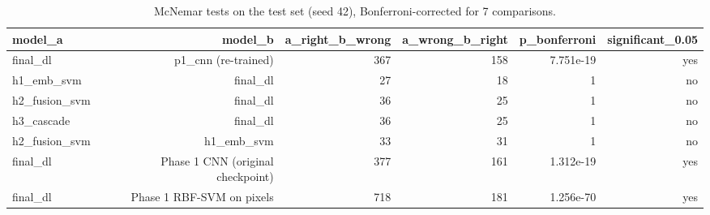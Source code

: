 \begin{table}[t]
\centering
\caption{McNemar tests on the test set (seed 42), Bonferroni-corrected for 7 comparisons.}
\label{tab:p2_mcnemar}
\footnotesize
\begin{tabular}{lrrrrr}
\toprule
model\_a & model\_b & a\_right\_b\_wrong & a\_wrong\_b\_right & p\_bonferroni & significant\_0.05 \\
\midrule
final\_dl & p1\_cnn (re-trained) & 367 & 158 & 7.751e-19 & yes \\
h1\_emb\_svm & final\_dl & 27 & 18 & 1 & no \\
h2\_fusion\_svm & final\_dl & 36 & 25 & 1 & no \\
h3\_cascade & final\_dl & 36 & 25 & 1 & no \\
h2\_fusion\_svm & h1\_emb\_svm & 33 & 31 & 1 & no \\
final\_dl & Phase 1 CNN (original checkpoint) & 377 & 161 & 1.312e-19 & yes \\
final\_dl & Phase 1 RBF-SVM on pixels & 718 & 181 & 1.256e-70 & yes \\
\bottomrule
\end{tabular}
\end{table}
